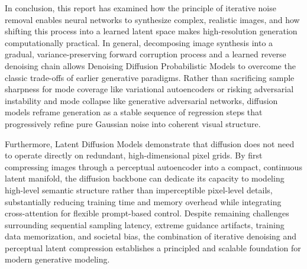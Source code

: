 \documentclass[10pt,a4paper]{article}
\begin{document}
In conclusion, this report has examined how the principle of iterative noise removal enables neural networks to synthesize complex, realistic images, and how shifting this process into a learned latent space makes high-resolution generation computationally practical. In general, decomposing image synthesis into a gradual, variance-preserving forward corruption process and a learned reverse denoising chain allows Denoising Diffusion Probabilistic Models to overcome the classic trade-offs of earlier generative paradigms. Rather than sacrificing sample sharpness for mode coverage like variational autoencoders or risking adversarial instability and mode collapse like generative adversarial networks, diffusion models reframe generation as a stable sequence of regression steps that progressively refine pure Gaussian noise into coherent visual structure.

Furthermore, Latent Diffusion Models demonstrate that diffusion does not need to operate directly on redundant, high-dimensional pixel grids. By first compressing images through a perceptual autoencoder into a compact, continuous latent manifold, the diffusion backbone can dedicate its capacity to modeling high-level semantic structure rather than imperceptible pixel-level details, substantially reducing training time and memory overhead while integrating cross-attention for flexible prompt-based control. Despite remaining challenges surrounding sequential sampling latency, extreme guidance artifacts, training data memorization, and societal bias, the combination of iterative denoising and perceptual latent compression establishes a principled and scalable foundation for modern generative modeling.
\end{document}
